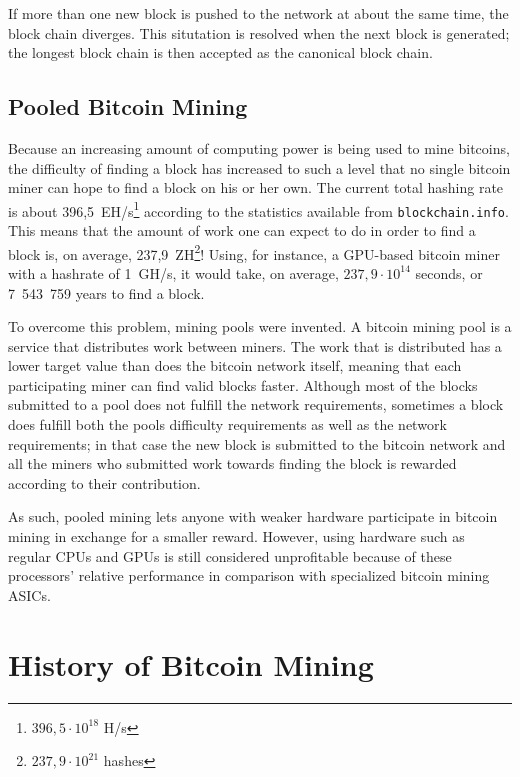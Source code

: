 If more than one new block is pushed to the network at about the same time, the block chain diverges.
This situtation is resolved when the next block is generated; the longest block chain is then accepted
as the canonical block chain. \cite{bitcoin}

\subsection{Pooled Bitcoin Mining}

Because an increasing amount of computing power is being used to mine bitcoins, the difficulty of finding
a block has increased to such a level that no single bitcoin miner can hope to find a block on his or her
own. The current total hashing rate is about 396,5~EH/s\footnote{$396,5\cdot 10^{18}$ H/s} according to the
statistics available from \texttt{blockchain.info}. This means that the amount of work one can expect to
do in order to find a block is, on average, 237,9~ZH\footnote{$237,9\cdot 10^{21}$ hashes}! Using, for instance,
a GPU-based bitcoin miner with a hashrate of 1~GH/s, it would take, on average, $237,9\cdot 10^{14}$ seconds,
or 7~543~759 years to find a block.

To overcome this problem, mining pools were invented. A bitcoin mining pool is a service that distributes
work between miners. The work that is distributed has a lower target value than does the bitcoin network
itself, meaning that each participating miner can find valid blocks faster. Although most of the blocks
submitted to a pool does not fulfill the network requirements, sometimes a block does fulfill both the
pools difficulty requirements as well as the network requirements; in that case the new block is
submitted to the bitcoin network and all the miners who submitted work towards finding the block
is rewarded according to their contribution.

As such, pooled mining lets anyone with weaker hardware participate in bitcoin mining in exchange for
a smaller reward. However, using hardware such as regular CPUs and GPUs is still considered unprofitable
because of these processors' relative performance in comparison with specialized bitcoin mining ASICs.

\section{History of Bitcoin Mining}



